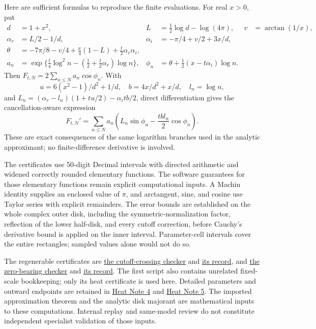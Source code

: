 \documentclass[11pt]{article}
\numberwithin{equation}{section}
\theoremstyle{definition}
\theoremstyle{remark}
\begin{document}
Here are sufficient formulas to reproduce the finite evaluations.  For
real \(x>0\), put
\begin{align*}
 d&=1+x^2, & L&=\tfrac12\log d-\log(4\pi),
 & v&=\arctan(1/x),\\
 \alpha_r&=L/2-1/d,&
 \alpha_i&=-\pi/4+v/2+3x/d,\\
 \theta&=-7\pi/8-v/4+\tfrac x4(1-L)
                     +\tfrac t2\alpha_r\alpha_i,\\
 a_n&=\exp\{\tfrac t4\log^2n
                -(\tfrac12+\tfrac t2\alpha_r)\log n\},&
 \phi_n&=\theta+\tfrac12(x-t\alpha_i)\log n.
\end{align*}
Then \(F_{t,N}=2\sum_{n\le N}a_n\cos\phi_n\).
With
\[
 u=6(x^2-1)/d^2+1/d,\quad b=4x/d^2+x/d,\quad l_n=\log n,
\]
and \(L_n=(\alpha_r-l_n)(1+tu/2)-\alpha_i tb/2\), direct
differentiation gives the cancellation-aware expression
\[
 F_{t,N}'=\sum_{n\le N}a_n
        \left(L_n\sin\phi_n-\frac{tb l_n}{2}\cos\phi_n\right).
\]
These are exact consequences of the same logarithm branches used in the
analytic approximant; no finite-difference derivative is involved.

The certificates use 50-digit Decimal intervals with directed arithmetic
and widened correctly rounded elementary functions.  The software
guarantees for those elementary functions remain explicit computational
inputs.  A Machin identity supplies an enclosed value of \(\pi\), and
arctangent, sine, and cosine use Taylor series with explicit remainders.
The error bounds are established on the whole complex outer disk, including
the symmetric-normalization factor, reflection of the lower half-disk, and
every cutoff correction, before Cauchy's derivative bound is applied on
the inner interval.  Parameter-cell intervals cover the entire rectangles;
sampled values alone would not do so.

The regenerable certificates are
\href{../numerics/check_fixed_heat_checkpoint.py}{the cutoff-crossing checker}
and
\href{../numerics/fixed_heat_checkpoint_record_20261009.json}{its record},
and
\href{../numerics/check_zero_bearing_heat_cell.py}{the zero-bearing checker}
and
\href{../numerics/zero_bearing_heat_cell_record_20261009.json}{its record}.
The first script also contains unrelated fixed-scale bookkeeping; only
its heat certificate is used here.  Detailed parameters and outward
endpoints are retained in
\href{notes/4_CERTIFIED_COMPACT_CUTOFF_CROSSING_20261009.md}{Heat Note 4}
and
\href{notes/5_CERTIFIED_ZERO_BEARING_DERIVATIVE_CELL_20261009.md}{Heat Note 5}.
The imported approximation theorem and the analytic disk majorant are
mathematical inputs to these computations.  Internal replay and same-model
review do not constitute independent specialist validation of those inputs.
\end{document}
